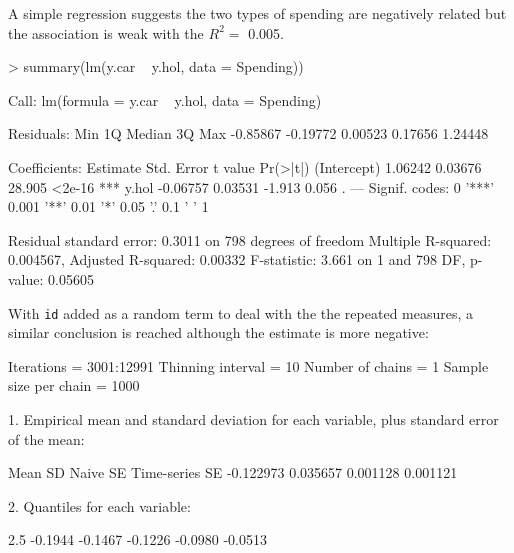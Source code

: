 \documentclass{article}
\begin{document}
A simple regression suggests the two types of spending are negatively related but the association is weak with the $R^{2}=$ 0.005.

\begin{Schunk}
\begin{Sinput}
> summary(lm(y.car ~ y.hol, data = Spending))
\end{Sinput}
\begin{Soutput}
Call:
lm(formula = y.car ~ y.hol, data = Spending)

Residuals:
     Min       1Q   Median       3Q      Max 
-0.85867 -0.19772  0.00523  0.17656  1.24448 

Coefficients:
            Estimate Std. Error t value Pr(>|t|)    
(Intercept)  1.06242    0.03676  28.905   <2e-16 ***
y.hol       -0.06757    0.03531  -1.913    0.056 .  
---
Signif. codes:  0 '***' 0.001 '**' 0.01 '*' 0.05 '.' 0.1 ' ' 1 

Residual standard error: 0.3011 on 798 degrees of freedom
Multiple R-squared: 0.004567,	Adjusted R-squared: 0.00332 
F-statistic: 3.661 on 1 and 798 DF,  p-value: 0.05605 
\end{Soutput}
\end{Schunk}

With \texttt{id} added as a random term to deal with the the repeated measures, a similar conclusion is reached although the estimate is more negative:

\iftalk
\else
\fi

\begin{Schunk}
\begin{Soutput}
Iterations = 3001:12991
Thinning interval = 10 
Number of chains = 1 
Sample size per chain = 1000 

1. Empirical mean and standard deviation for each variable,
   plus standard error of the mean:

          Mean             SD       Naive SE Time-series SE 
     -0.122973       0.035657       0.001128       0.001121 

2. Quantiles for each variable:

   2.5%
-0.1944 -0.1467 -0.1226 -0.0980 -0.0513 
\end{Soutput}
\end{Schunk}
\end{document}
